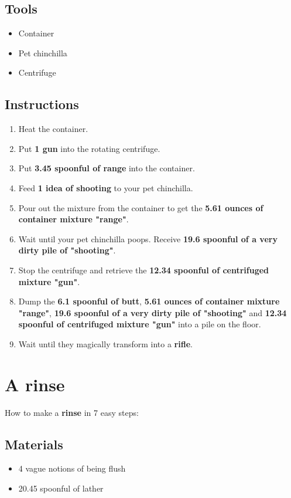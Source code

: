 \documentclass{article}
\begin{document}
\subsection{Tools}\begin{itemize}
\item 
Container
\item 
Pet chinchilla
\item 
Centrifuge
\end{itemize}
\subsection{Instructions}\begin{enumerate}
\item 
Heat the container.
\item 
Put \textbf{1 gun} into the rotating centrifuge.
\item 
Put \textbf{3.45 spoonful of range} into the container.
\item 
Feed \textbf{1 idea of shooting} to your pet chinchilla.
\item 
Pour out the mixture from the container to get the \textbf{5.61 ounces of container mixture "range"}.
\item 
Wait until your pet chinchilla poops. Receive \textbf{19.6 spoonful of a very dirty pile of "shooting"}.
\item 
Stop the centrifuge and retrieve the \textbf{12.34 spoonful of centrifuged mixture "gun"}.
\item 
Dump the \textbf{6.1 spoonful of butt}, \textbf{5.61 ounces of container mixture "range"}, \textbf{19.6 spoonful of a very dirty pile of "shooting"} and \textbf{12.34 spoonful of centrifuged mixture "gun"} into a pile on the floor.
\item 
Wait until they magically transform into a \textbf{rifle}.
\end{enumerate}
\newpage
\section{A rinse}How to make a \textbf{rinse} in 7 easy steps:

\subsection{Materials}\begin{itemize}
\item 
4 vague notions of being flush
\item 
20.45 spoonful of lather
\end{itemize}
\end{document}

